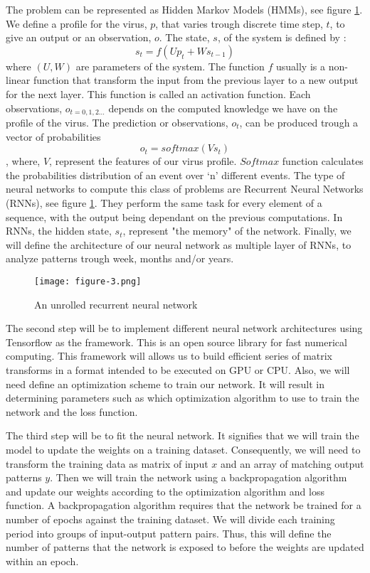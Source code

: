 \documentclass[12pt]{article}
\begin{document}
The problem can be represented as Hidden Markov Models (HMMs), see figure \ref{fig:RNN}. We define a profile for the virus, $p$, that varies trough discrete time step, $t$, to give an output or an observation, $o$. The state, $s$, of the system is defined by : 
$$s_t = f(Up_t+ Ws_{t-1})$$ where $(U,W)$ are parameters of the system. The function $f$ usually is a non-linear function that transform the input from the previous layer to a new output for the next layer. This function is called an activation function. Each observations, $o_{t=0,1,2 ... }$ depends on the computed knowledge we have on the profile of the virus. The prediction or observations, $o_t$, can be produced trough a vector of probabilities  $$o_t=softmax(Vs_t)$$, where, $V$, represent the features of our virus profile. $Softmax$ function calculates the probabilities distribution of an event over ‘n’ different events. 
The type of neural networks to compute this class of problems are Recurrent Neural Networks (RNNs), see figure \ref{fig:RNN}. They perform the same task for every element of a sequence, with the output being dependant on the previous computations. In RNNs, the hidden state, $s_t$, represent "the memory" of the network. 
Finally, we will define the architecture of our neural network as multiple layer of RNNs, to analyze patterns trough week, months and/or years. 

\begin{figure}[h]
    \centering
    \texttt{[image: figure-3.png]}
    \caption{ An unrolled recurrent neural network }
    \label{fig:RNN}
\end{figure}

The second step will be to implement different neural network architectures using Tensorflow as the framework. This is an open source library for fast numerical computing. This framework will allows us to build efficient series of matrix transforms in a format intended to be executed on GPU or CPU. Also, we will need define an optimization scheme to train our network. It will result in  determining parameters such as which optimization algorithm to use to train the network and the loss function\autocite{LeCun2015}.

The third step will be to fit the neural network. It signifies that we will train the model to update the weights on a training dataset. Consequently, we will need to transform the training data as matrix of input $x$ and an array of matching output patterns $y$. Then we will train the network using a backpropagation algorithm\autocite{LeCun2015} and update our weights according to the optimization algorithm and loss function.
A backpropagation algorithm requires that the network be trained for a number of epochs against the training dataset. We will divide each training period into groups of input-output pattern pairs. Thus, this will define the number of patterns that the network is exposed to before the weights are updated within an epoch.
\end{document}
